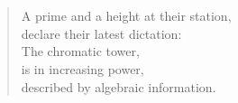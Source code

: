 

\section*{}



\vspace*{6cm}

\begin{verse}
    \hspace{3em}A prime and a height at their station, \\
    \vspace{5pt}
    \hspace{3em}declare their latest dictation: \\
    \vspace{5pt}
    \hspace{3em}The chromatic tower, \\
    \vspace{5pt}
    \hspace{3em}is in increasing power, \\
    \vspace{5pt}
    \hspace{3em}described by algebraic information.

\end{verse}










